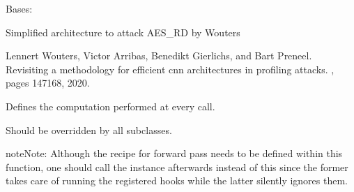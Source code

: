 \documentclass[letterpaper,10pt,english]{sphinxmanual}
\begin{document}
\begin{fulllineitems}
\label{\detokenize{MLSCAlib.Architectures:MLSCAlib.Architectures.torch_models.Simple_AES_RD}}
\pysigstartsignatures
{}
\pysigstopsignatures
\sphinxAtStartPar
Bases: 

\sphinxAtStartPar
Simplified architecture to attack AES\_RD by Wouters %
\begin{footnote}[11]\sphinxAtStartFootnote
Lennert Wouters, Victor Arribas, Benedikt Gierlichs, and Bart Preneel. Revisiting a methodology for efficient cnn architectures in profiling attacks. , pages 147\textendash{}168, 2020.
%
\end{footnote}

\begin{fulllineitems}
\label{\detokenize{MLSCAlib.Architectures:MLSCAlib.Architectures.torch_models.Simple_AES_RD.forward}}
\pysigstartsignatures
{}
\pysigstopsignatures
\sphinxAtStartPar
Defines the computation performed at every call.

\sphinxAtStartPar
Should be overridden by all subclasses.

\begin{sphinxadmonition}{note}{Note:}
\sphinxAtStartPar
Although the recipe for forward pass needs to be defined within
this function, one should call the  instance afterwards
instead of this since the former takes care of running the
registered hooks while the latter silently ignores them.
\end{sphinxadmonition}

\end{fulllineitems}



\end{fulllineitems}
\end{document}
